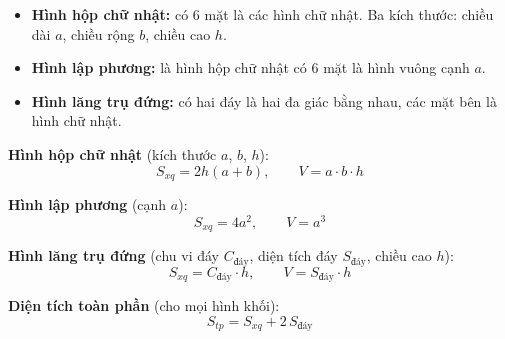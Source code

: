 \documentclass[12pt,a4paper]{article}
\begin{document}
\begin{dinhnghia}
\begin{itemize}
  \item \textbf{Hình hộp chữ nhật:} có 6 mặt là các hình chữ nhật. Ba kích thước: chiều dài $a$, chiều rộng $b$, chiều cao $h$.
  \item \textbf{Hình lập phương:} là hình hộp chữ nhật có 6 mặt là hình vuông cạnh $a$.
  \item \textbf{Hình lăng trụ đứng:} có hai đáy là hai đa giác bằng nhau, các mặt bên là hình chữ nhật.
\end{itemize}
\end{dinhnghia}

\begin{congthuc}[title={Diện tích xung quanh và thể tích}]
\textbf{Hình hộp chữ nhật} (kích thước $a$, $b$, $h$):
\[
  S_{xq} = 2h(a + b), \qquad V = a \cdot b \cdot h
\]

\textbf{Hình lập phương} (cạnh $a$):
\[
  S_{xq} = 4a^2, \qquad V = a^3
\]

\textbf{Hình lăng trụ đứng} (chu vi đáy $C_{\text{đáy}}$, diện tích đáy $S_{\text{đáy}}$, chiều cao $h$):
\[
  S_{xq} = C_{\text{đáy}} \cdot h, \qquad V = S_{\text{đáy}} \cdot h
\]

\medskip
\textbf{Diện tích toàn phần} (cho mọi hình khối):
\[
  S_{tp} = S_{xq} + 2\,S_{\text{đáy}}
\]
\end{congthuc}
\end{document}

